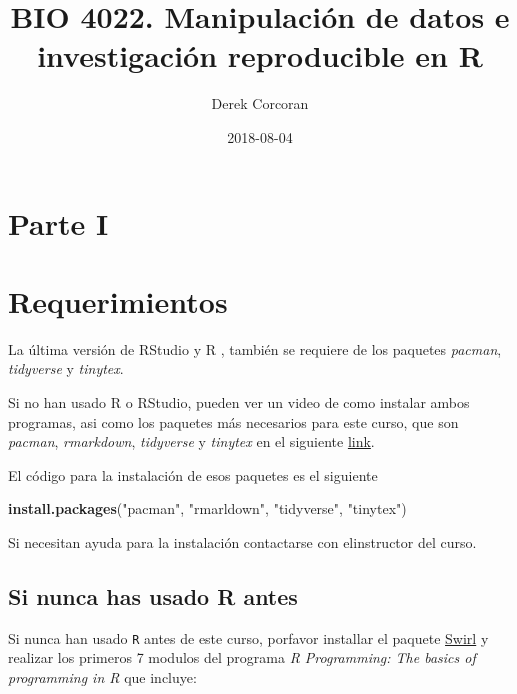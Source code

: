 \documentclass[]{book}
\title{BIO 4022. Manipulación de datos e investigación reproducible en R}
\author{Derek Corcoran}
\date{2018-08-04}
\newenvironment{Shaded}{\begin{snugshade}}{\end{snugshade}}
\newcommand{\KeywordTok}[1]{\textcolor[rgb]{0.13,0.29,0.53}{\textbf{#1}}}
\newcommand{\NormalTok}[1]{#1}
\newcommand{\StringTok}[1]{\textcolor[rgb]{0.31,0.60,0.02}{#1}}
\begin{document}
\maketitle

{
\setcounter{tocdepth}{1}
\tableofcontents
}
\hypertarget{parte-i}{%
\chapter*{Parte I}\label{parte-i}}

\hypertarget{requerimientos}{%
\chapter{Requerimientos}\label{requerimientos}}

La última versión de RStudio y R \citep{R-base}, también se requiere de
los paquetes \emph{pacman}, \emph{tidyverse} y \emph{tinytex}.

Si no han usado R o RStudio, pueden ver un video de como instalar ambos
programas, asi como los paquetes más necesarios para este curso, que son
\emph{pacman}, \emph{rmarkdown}, \emph{tidyverse} y \emph{tinytex} en el
siguiente \href{https://youtu.be/RtkCAKXsVbw}{link}.

El código para la instalación de esos paquetes es el siguiente

\begin{Shaded}
\begin{Highlighting}[]
\KeywordTok{install.packages}\NormalTok{(}\StringTok{"pacman"}\NormalTok{, }\StringTok{"rmarldown"}\NormalTok{, }\StringTok{"tidyverse"}\NormalTok{, }\StringTok{"tinytex"}\NormalTok{)}
\end{Highlighting}
\end{Shaded}

Si necesitan ayuda para la instalación contactarse con elinstructor del
curso.

\hypertarget{si-nunca-has-usado-r-antes}{%
\section{Si nunca has usado R antes}\label{si-nunca-has-usado-r-antes}}

Si nunca han usado \texttt{R} antes de este curso, porfavor installar el
paquete \href{http://swirlstats.com/students.html}{Swirl}
\citep{Kross2017} y realizar los primeros 7 modulos del programa \emph{R
Programming: The basics of programming in R} que incluye:
\end{document}
